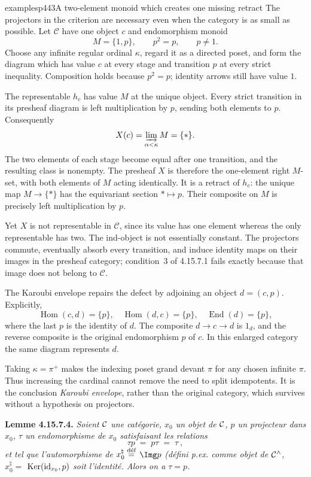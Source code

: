 \begin{dcomment}{examples}{p443}{A two-element monoid which creates one missing retract}
The projectors in the criterion are necessary even when the category is as small as possible. Let $\mathcal C$ have one object $c$ and endomorphism monoid
\[
M=\{1,p\},\qquad p^2=p,\qquad p\ne1.
\]
Choose any infinite regular ordinal $\kappa$, regard it as a directed poset, and form the diagram which has value $c$ at every stage and transition $p$ at every strict inequality. Composition holds because $p^2=p$; identity arrows still have value $1$.

The representable $h_c$ has value $M$ at the unique object. Every strict transition in its presheaf diagram is left multiplication by $p$, sending both elements to $p$. Consequently
\[
X(c)=\varinjlim_{\alpha<\kappa}M=\{*\}.
\]
The two elements of each stage become equal after one transition, and the resulting class is nonempty. The presheaf $X$ is therefore the one-element right $M$-set, with both elements of $M$ acting identically. It is a retract of $h_c$: the unique map $M\to\{*\}$ has the equivariant section $*\mapsto p$. Their composite on $M$ is precisely left multiplication by $p$.

Yet $X$ is not representable in $\mathcal C$, since its value has one element whereas the only representable has two. The ind-object is not essentially constant. The projectors commute, eventually absorb every transition, and induce identity maps on their images in the presheaf category; condition~3 of 4.15.7.1 fails exactly because that image does not belong to $\mathcal C$.

The Karoubi envelope repairs the defect by adjoining an object $d=(c,p)$. Explicitly,
\[
\operatorname{Hom}(c,d)=\{p\},\quad
\operatorname{Hom}(d,c)=\{p\},\quad
\operatorname{End}(d)=\{p\},
\]
where the last $p$ is the identity of $d$. The composite $d\to c\to d$ is $1_d$, and the reverse composite is the original endomorphism $p$ of $c$. In this enlarged category the same diagram represents $d$.

Taking $\kappa=\pi^+$ makes the indexing poset grand devant $\pi$ for any chosen infinite $\pi$. Thus increasing the cardinal cannot remove the need to split idempotents. It is the conclusion \emph{Karoubi envelope}, rather than the original category, which survives without a hypothesis on projectors.
\end{dcomment}


\textbf{Lemme 4.15.7.4.} \textit{Soient $\cC$ une catégorie, $x_0$ un objet de $\cC$, $p$ un projecteur dans $x_0$, $\tau$ un endomorphisme de $x_0$ satisfaisant les relations}
\[
\tau p \;=\; p\tau \;=\; \tau\ , \tag*{$(*)$}
\]
\textit{et tel que l'automorphisme de $x_0^\natural \defeq$} $\Img p$ \textit{(défini p.ex. comme objet de $\cC^\wedge$, $x_0^\natural =$} $\Ker(\id_{x_0},p)$ %
\textit{soit l'identité. Alors on a $\tau = p$.}

